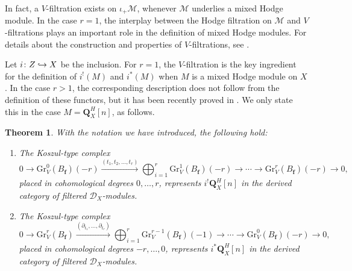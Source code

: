 \documentclass[11pt]{article}
\numberwithin{equation}{section}
\renewcommand{\theenumi}{\alph{enumi}}
\newenvironment{enumeratei}
{\bgroup\def\theenumi{\roman{enumi}}\def\theenumii{\arabic{enumii}}\begin{enumerate}}
{\end{enumerate}\egroup}
\newcommand\hto{\mathrel{\lhook\joinrel\to}}
\newcommand{\DXmodules}{$\cD_X$\nobreakdash-mod\-ules\xspace}
\theoremstyle{plain}
\newtheorem{thm}{Theorem}[section]
\theoremstyle{definition}
\newcommand\Q{{\mathbf Q}}
\newcommand\cD{\mathcal{D}}
\newcommand\cM{\mathcal{M}}
\newcommand\bff{{\boldsymbol f}}
\newcommand\gr{\mathrm{Gr}}
\begin{document}
In fact, a $V$-filtration exists on $\iota_+\cM$, whenever $\cM$ underlies
a mixed Hodge module. In the case $r=1$, the interplay between the Hodge filtration on $\cM$ and $V$-filtrations plays an important role in the definition of mixed Hodge modules. For details about the construction and properties of $V$-filtrations, see \cite{BMS}.

Let $i\colon Z\hto X$ be the inclusion. For $r=1$, the $V$-filtration is the key ingredient for the definition of $i^!(M)$ and $i^*(M)$ when $M$ is a
mixed Hodge module on $X$. In the case $r>1$, the corresponding description does not follow from the definition of these functors, but it has been recently
proved in \cite[Th.\,1.2]{CD}. We only state this in the case $M=\Q_X^H[n]$, as follows.

\begin{thm}\label{thm_CD}
With the notation we have introduced, the following hold:
\begin{enumeratei}
\item\label{thm_CDi}
The Koszul-type complex
\[0\to \gr^0_V(B_\bff)(-r) \xrightarrow{(t_1,t_2,\dots,t_r)} \bigoplus^r_{i=1}\gr^1_V(B_\bff)(-r) \to \cdots \to
\gr^r_V(B_\bff)(-r)\to 0,\]
placed in cohomological degrees $0,\ldots,r$, represents $i^!\Q_X^H[n]$ in the derived category of filtered \DXmodules.
\item\label{thm_CDii}
The Koszul-type complex
\[0\to \gr_V^r(B_{\bff})\xrightarrow{(\partial_{t_1},\dots,\partial_{t_r})} \bigoplus_{i=1}^r\gr_V^{r-1}(B_{\bff})(-1)\to\cdots\to \gr_V^0(B_{\bff})(-r)\to 0,\]
placed in cohomological degrees $-r,\ldots,0$, represents $i^*\Q_X^H[n]$ in the derived category of filtered \DXmodules.
\end{enumeratei}
\end{thm}
\end{document}

